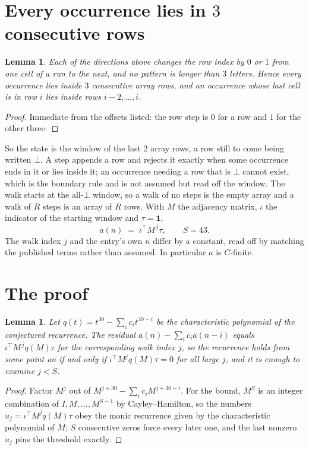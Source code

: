 \documentclass[11pt,a4paper]{article}
\theoremstyle{plain}
\newtheorem{lemma}[theorem]{Lemma}
\theoremstyle{definition}
\begin{document}
\section{Every occurrence lies in $3$ consecutive rows}

\begin{lemma}\label{lem:win}
Each of the directions above changes the row index by $0$ or $1$ from one cell of a run to the
next, and no pattern is longer than $3$ letters. Hence every occurrence lies inside $3$
consecutive array rows, and an occurrence whose last cell is in row $i$ lies inside rows
$i-2,\dots,i$.
\end{lemma}

\begin{proof}
Immediate from the offsets listed: the row step is $0$ for a row and $1$ for the other three.
\end{proof}

So the state is the window of the last $2$ array rows, a row still to come being written
$\bot$. A step appends a row and rejects it exactly when some occurrence ends in it or lies
inside it; an occurrence needing a row that is $\bot$ cannot exist, which is the boundary rule
and is not assumed but read off the window. The walk starts at the all-$\bot$ window, so a walk
of no steps is the empty array and a walk of $R$ steps is an array of $R$ rows. With $M$ the
adjacency matrix, $\iota$ the indicator of the starting window and $\tau=\mathbf{1}$,
\[
a(n)\;=\;\iota^{\!\top}M^{\,j}\tau ,\qquad S=43.
\]
The walk index $j$ and the entry's own $n$ differ by a constant, read off by matching the
published terms rather than assumed. In particular $a$ is $C$-finite.

\section{The proof}

\begin{lemma}\label{lem:crit}
Let $q(t)=t^{30}-\sum_i c_it^{30-i}$ be the characteristic polynomial of the
conjectured recurrence. The residual $a(n)-\sum_ic_ia(n-i)$ equals
$\iota^{\!\top}M^{\,j}q(M)\tau$ for the corresponding walk index $j$, so the recurrence
holds from some point on if and only if $\iota^{\!\top}M^{j}q(M)\tau=0$ for all large $j$,
and it is enough to examine $j<S$.
\end{lemma}

\begin{proof}
Factor $M^{j}$ out of $M^{j+30}-\sum_ic_iM^{j+30-i}$. For the bound, $M^{S}$
is an integer combination of $I,M,\dots,M^{S-1}$ by Cayley--Hamilton, so the numbers
$u_j=\iota^{\!\top}M^{j}q(M)\tau$ obey the monic recurrence given by the characteristic
polynomial of $M$; $S$ consecutive zeros force every later one, and the last nonzero $u_j$
pins the threshold exactly.
\end{proof}
\end{document}
